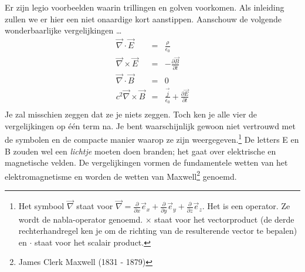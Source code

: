 \documentclass{ximera}
\begin{document}
	\author{Bart Lambregs}
    \xmsource\xmuitleg



	Er zijn legio voorbeelden waarin trillingen en golven voorkomen. Als inleiding zullen we er hier een niet onaardige kort aanstippen. Aanschouw de volgende wonderbaarlijke vergelijkingen \ldots
	\begin{eqnarray*}
	\vec{\nabla}\cdot\vec{E}&=&\frac{\rho}{\epsilon_0}\\[3mm]
	\vec{\nabla}\times\vec{E}&=&-\frac{\partial\vec{B}}{\partial t}\\[3mm]
	\vec{\nabla}\cdot\vec{B}&=&0\\[3mm]
	c^2\vec{\nabla}\times\vec{B}&=&\frac{\vec{j}}{\epsilon_0}+\frac{\partial\vec{E}}{\partial t}\\
	\end{eqnarray*}
	Je zal misschien zeggen dat ze je niets zeggen. Toch ken je alle vier de vergelijkingen op \'e\'en term na. Je bent waarschijnlijk gewoon niet vertrouwd met de symbolen en de compacte manier waarop ze zijn weergegeven.\footnote{Het symbool $\vec{\nabla}$ staat voor $\vec{\nabla}=\frac{\partial}{\partial x}\vec{e}_x+\frac{\partial}{\partial y}\vec{e}_y+\frac{\partial}{\partial z}\vec{e}_z$. Het is een operator. Ze wordt de nabla-operator genoemd. $\times$ staat voor het vectorproduct (de derde rechterhandregel ken je om de richting van de resulterende vector te bepalen) en $\cdot$ staat voor het scalair product.} De letters E en B zouden wel een \emph{lichtje} moeten doen branden; het gaat over elektrische en magnetische velden. De vergelijkingen vormen de fundamentele wetten van het elektromagnetisme en worden de wetten van Maxwell\footnote{James Clerk Maxwell (1831 - 1879)} genoemd.
	
	
\end{document}
